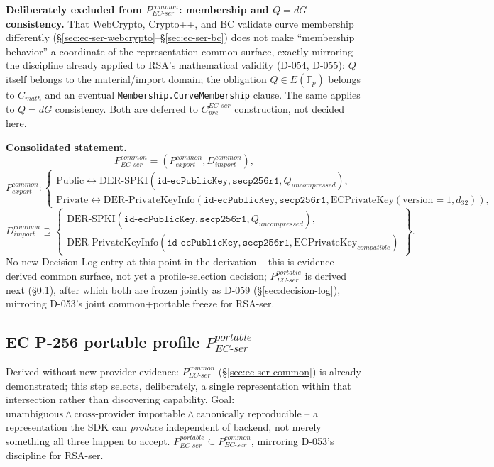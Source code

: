 \documentclass[11pt,a4paper]{article}
\begin{document}
\textbf{Deliberately excluded from $P_{EC\text{-}ser}^{common}$: membership and $Q=dG$ consistency.} That WebCrypto, Crypto++, and BC validate curve membership differently (\S\ref{sec:ec-ser-webcrypto}--\S\ref{sec:ec-ser-bc}) does not make ``membership behavior'' a coordinate of the representation-common surface, exactly mirroring the discipline already applied to RSA's mathematical validity (D-054, D-055): $Q$ itself belongs to the material/import domain; the obligation $Q\in E(\mathbb{F}_p)$ belongs to $C_{math}$ and an eventual \texttt{Membership.CurveMembership} clause. The same applies to $Q=dG$ consistency. Both are deferred to $C_{pre}^{EC\text{-}ser}$ construction, not decided here.

\textbf{Consolidated statement.}
\[
P_{EC\text{-}ser}^{common} = (P_{export}^{common}, D_{import}^{common}),
\]
\[
P_{export}^{common}: \begin{cases}
\text{Public} \leftrightarrow \text{DER-SPKI}(\texttt{id-ecPublicKey}, \texttt{secp256r1}, Q_{uncompressed}), \\
\text{Private} \leftrightarrow \text{DER-PrivateKeyInfo}(\texttt{id-ecPublicKey}, \texttt{secp256r1}, \text{ECPrivateKey}(\text{version}{=}1, d_{32})),
\end{cases}
\]
\[
D_{import}^{common} \supseteq \left\{
\begin{array}{l}
\text{DER-SPKI}(\texttt{id-ecPublicKey}, \texttt{secp256r1}, Q_{uncompressed}), \\
\text{DER-PrivateKeyInfo}(\texttt{id-ecPublicKey}, \texttt{secp256r1}, \text{ECPrivateKey}_{compatible})
\end{array}
\right\}.
\]
No new Decision Log entry at this point in the derivation -- this is evidence-derived common surface, not yet a profile-selection decision; $P_{EC\text{-}ser}^{portable}$ is derived next (\S\ref{sec:ec-ser-portable}), after which both are frozen jointly as D-059 (\S\ref{sec:decision-log}), mirroring D-053's joint common+portable freeze for RSA-ser.

\subsection{EC P-256 portable profile \texorpdfstring{$P_{EC\text{-}ser}^{portable}$}{P EC-ser portable}}\label{sec:ec-ser-portable}

Derived without new provider evidence: $P_{EC\text{-}ser}^{common}$ (\S\ref{sec:ec-ser-common}) is already demonstrated; this step selects, deliberately, a single representation within that intersection rather than discovering capability. Goal: $\text{unambiguous} \wedge \text{cross-provider importable} \wedge \text{canonically reproducible}$ -- a representation the SDK can \emph{produce} independent of backend, not merely something all three happen to accept. $P_{EC\text{-}ser}^{portable} \subseteq P_{EC\text{-}ser}^{common}$, mirroring D-053's discipline for RSA-ser.
\end{document}
